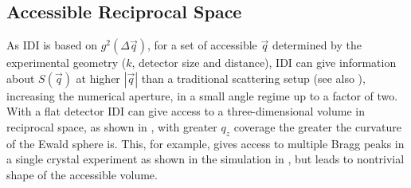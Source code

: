 \subsection{Accessible Reciprocal Space}

As IDI is based on $g^2(\Delta \vec{q})$, for a set of accessible $\vec{q}$ determined by the experimental geometry ($k$, detector size and distance), IDI can give information about $S(\vec{q})$ at higher $\left|\vec{q}\right|$ than a traditional scattering setup (see also ), increasing the numerical aperture, in a small angle regime up to a factor of two. With a flat detector IDI can give access to a three-dimensional volume in reciprocal space, as shown in , with greater $q_z$ coverage the greater the curvature of the Ewald sphere is. This, for example, gives access to multiple Bragg peaks in a single crystal experiment as shown in the simulation in , but leads to nontrivial shape of the accessible volume. 

